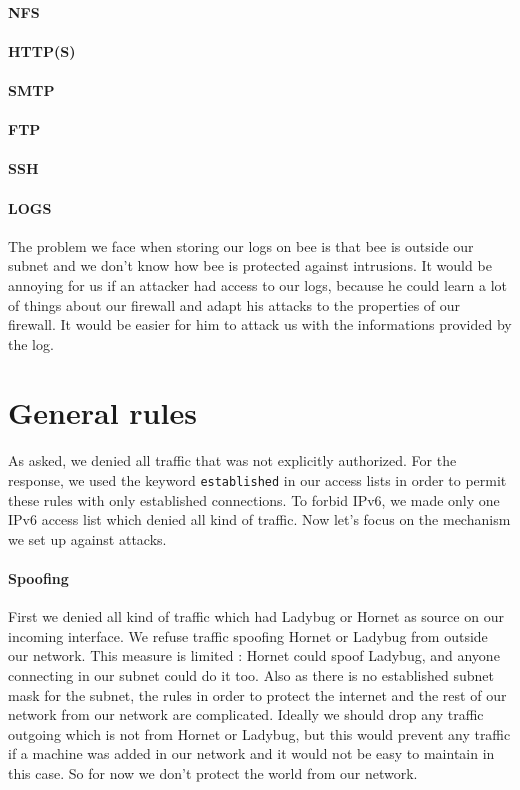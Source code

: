 \documentclass[a4paper,titlepage]{article}
\begin{document}
\paragraph{NFS}
\paragraph{HTTP(S)}
\paragraph{SMTP}
\paragraph{FTP}
\paragraph{SSH}
\paragraph{LOGS} The problem we face when storing our logs on bee is that bee is outside our subnet and we don't know how bee is protected against intrusions. It would be annoying for us if an attacker had access to our logs, because he could learn a lot of things about our firewall and adapt his attacks to the properties of our firewall. It would be easier for him to attack us with the informations provided by the log.

\section{General rules}
As asked, we denied all traffic that was not explicitly authorized. For the response, we used the keyword \texttt{established} in our access lists in order to permit these rules with only established connections. To forbid IPv6, we made only one IPv6 access list which denied all kind of traffic. Now let's focus on the mechanism we set up against attacks.

\paragraph{Spoofing}
First we denied all kind of traffic which had Ladybug or Hornet as source on our incoming interface. We refuse traffic spoofing Hornet or Ladybug from outside our network. This measure is limited : Hornet could spoof Ladybug, and anyone connecting in our subnet could do it too. Also as there is no established subnet mask for the subnet, the rules in order to protect the internet and the rest of our network from our network are complicated. Ideally we should drop any traffic outgoing which is not from Hornet or Ladybug, but this would prevent any traffic if a machine was added in our network and it would not be easy to maintain in this case. So for now we don't protect the world from our network.
\end{document}
